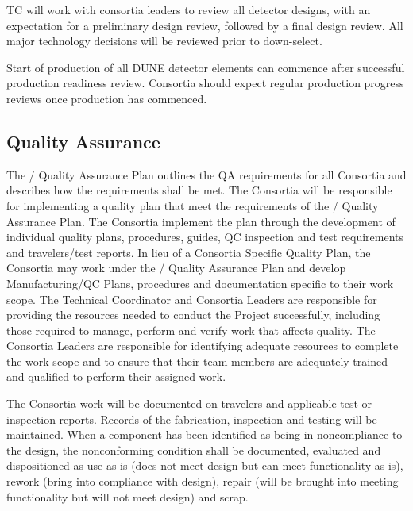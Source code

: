 TC will work with consortia leaders to review all detector designs,
with an expectation for a preliminary design review, followed by a
final design review. All major technology decisions will be reviewed
prior to down-select.

Start of production of all DUNE detector elements can commence after
successful production readiness review. Consortia should expect
regular production progress reviews once production has commenced.

\subsection{Quality Assurance}
\label{sec:fdsp-coord-qa}


The / Quality Assurance Plan outlines the QA
requirements for all  Consortia and describes how the
requirements shall be met. The Consortia will be responsible for
implementing a quality plan that meet the requirements of the
/ Quality Assurance Plan.  The Consortia
implement the plan through the development of individual quality
plans, procedures, guides, QC inspection and test requirements and
travelers/test reports.  In lieu of a Consortia Specific Quality Plan,
the Consortia may work under the / Quality
Assurance Plan and develop Manufacturing/QC Plans, procedures and
documentation specific to their work scope.  The 
Technical Coordinator and Consortia Leaders are responsible for
providing the resources needed to conduct the Project successfully,
including those required to manage, perform and verify work that
affects quality.  The  Consortia Leaders are responsible
for identifying adequate resources to complete the work scope and to
ensure that their team members are adequately trained and qualified to
perform their assigned work.

The Consortia work will be documented on travelers and applicable test
or inspection reports. Records of the fabrication, inspection and
testing will be maintained. When a component has been identified as
being in noncompliance to the design, the nonconforming condition
shall be documented, evaluated and dispositioned as use-as-is (does
not meet design but can meet functionality as is), rework (bring into
compliance with design), repair (will be brought into meeting
functionality but will not meet design) and scrap.

